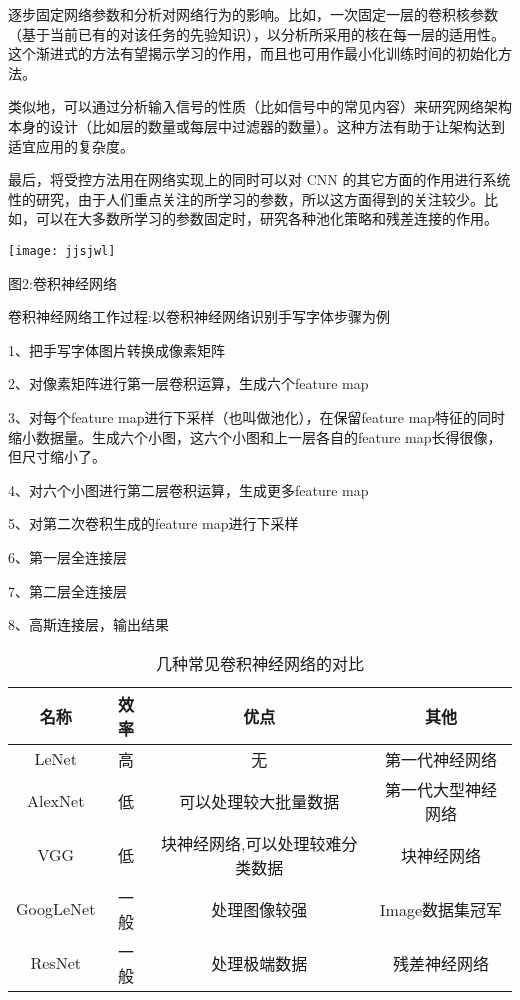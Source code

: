 \documentclass{article}
\begin{document}
逐步固定网络参数和分析对网络行为的影响。比如，一次固定一层的卷积核参数（基于当前已有的对该任务的先验知识），以分析所采用的核在每一层的适用性。这个渐进式的方法有望揭示学习的作用，而且也可用作最小化训练时间的初始化方法。\par
类似地，可以通过分析输入信号的性质（比如信号中的常见内容）来研究网络架构本身的设计（比如层的数量或每层中过滤器的数量）。这种方法有助于让架构达到适宜应用的复杂度。\par
最后，将受控方法用在网络实现上的同时可以对 CNN 的其它方面的作用进行系统性的研究，由于人们重点关注的所学习的参数，所以这方面得到的关注较少。比如，可以在大多数所学习的参数固定时，研究各种池化策略和残差连接的作用。
\begin{center}
\texttt{[image: jjsjwl]}
\caption{图2:卷积神经网络}
\end{center}

卷积神经网络工作过程:以卷积神经网络识别手写字体步骤为例

1、把手写字体图片转换成像素矩阵

2、对像素矩阵进行第一层卷积运算，生成六个feature map

3、对每个feature map进行下采样（也叫做池化），在保留feature map特征的同时缩小数据量。生成六个小图，这六个小图和上一层各自的feature map长得很像，但尺寸缩小了。

4、对六个小图进行第二层卷积运算，生成更多feature map

5、对第二次卷积生成的feature map进行下采样

6、第一层全连接层

7、第二层全连接层

8、高斯连接层，输出结果


\begin{table}[h]
    \centering
    \caption{几种常见卷积神经网络的对比}
\begin{tabular}{cccc}
    \hline
    名称 & 效率 &优点 & 其他\\
    \hline
    LeNet & 高&无&第一代神经网络 \\ 
    AlexNet &低&可以处理较大批量数据&第一代大型神经网络  \\
    VGG & 低&块神经网络,可以处理较难分类数据&块神经网络\\
    GoogLeNet&一般&处理图像较强&Image数据集冠军\\
    ResNet&一般&处理极端数据&残差神经网络\\
    \hline
\end{tabular}
    \label{table1}
\end{table}
\end{document}
